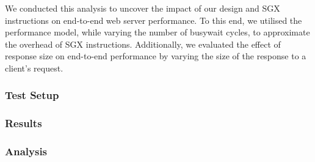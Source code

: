 \documentclass[../../../main.tex]{subfiles}
\begin{document}
We conducted this analysis to uncover the impact of our design and SGX
instructions on end-to-end web server performance. To this end, we
utilised the performance model, while varying the number of busywait
cycles, to approximate the overhead of SGX instructions. Additionally,
we evaluated the effect of response size on end-to-end performance by
varying the size of the response to a client's request.

\subsubsection*{Test Setup}
\subsubsection*{Results}
\subsubsection*{Analysis}
\end{document}
